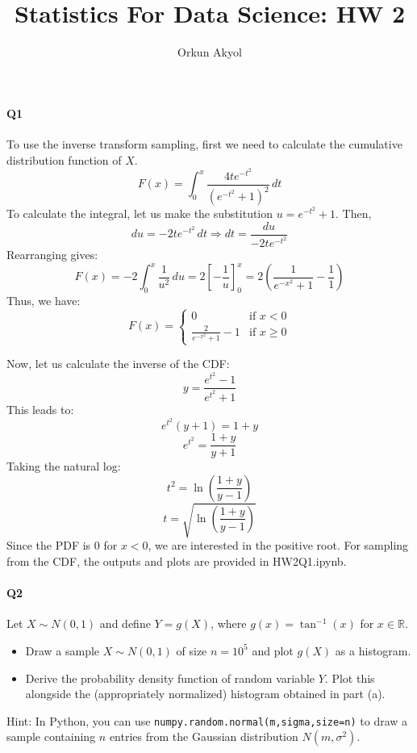 \documentclass[10pt,letterpaper]{article}
\author{Orkun Akyol}
\title{Statistics For Data Science: HW 2}
\begin{document}
\paragraph{Q1}
To use the inverse transform sampling, first we need to calculate the cumulative distribution function of \( X \). 
\[
F(x) = \int_{0}^{x} \frac{4te^{-t^2}}{(e^{-t^2}+1)^2} \,dt
\]    
To calculate the integral, let us make the substitution \( u = e^{-t^2}+1 \). Then,
\[
du = -2te^{-t^2} \,dt \Rightarrow dt = \frac{du}{-2te^{-t^2}}
\]
Rearranging gives:
\[
F(x) = -2 \int_{0}^{x} \frac{1}{u^2} \, du = 2\left[-\frac{1}{u}\right]_{0}^{x} = 2\left(\frac{1}{e^{-x^2}+1} - \frac{1}{1}\right) 
\]
Thus, we have:
\[
F(x) = \begin{cases}
0 & \text{if } x < 0\\
\frac{2}{e^{-x^2}+1}-1 & \text{if } x \ge 0
\end{cases}
\]

Now, let us calculate the inverse of the CDF:
\[
y = \frac{e^{t^2}-1}{e^{t^2}+1}
\]
This leads to:
\[
e^{t^2}(y + 1) = 1 + y
\]
\[
e^{t^2} = \frac{1 + y}{y + 1}
\]
Taking the natural log:
\[
t^2 = \ln\left(\frac{1+y}{y-1}\right)
\]
\[
t = \sqrt{\ln\left(\frac{1+y}{y-1}\right)}
\]
Since the PDF is \( 0 \) for \( x<0 \), we are interested in the positive root. For sampling from the CDF, the outputs and plots are provided in HW2Q1.ipynb.

\paragraph{Q2}
Let \( X \sim N(0, 1) \) and define \( Y = g(X) \), where \( g(x) = \tan^{-1}(x) \) for \( x \in \mathbb{R} \).
\begin{itemize}
    \item Draw a sample \( X \sim N(0, 1) \) of size \( n = 10^5 \) and plot \( g(X) \) as a histogram.
    \item Derive the probability density function of random variable \( Y \). Plot this alongside the (appropriately normalized) histogram obtained in part (a).
\end{itemize}
Hint: In Python, you can use \texttt{numpy.random.normal(m,sigma,size=n)} to draw a sample containing \( n \) entries from the Gaussian distribution \( N(m, \sigma^2) \).
\end{document}
